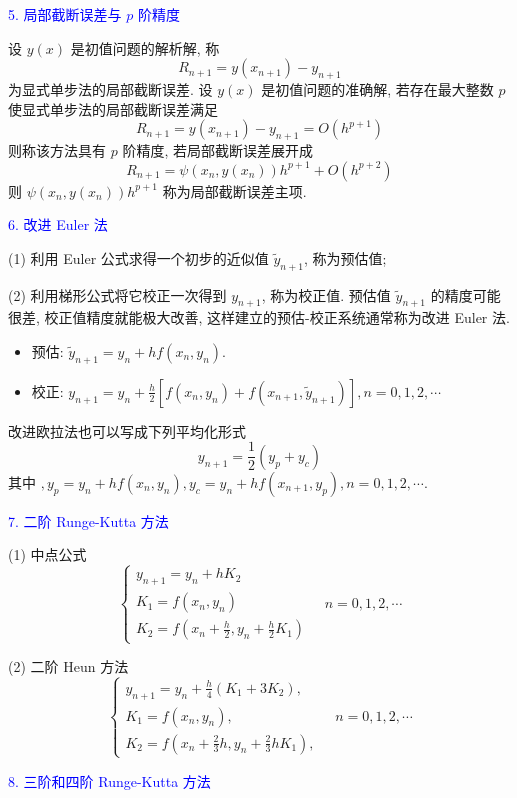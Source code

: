 \textcolor{blue}{5. 局部截断误差与 $ p $ 阶精度}

设 $ y(x) $ 是初值问题的解析解, 称
$$
R_{n+1}=y\left(x_{n+1}\right)-y_{n+1}
$$
为显式单步法的局部截断误差.
设 $ y(x) $ 是初值问题的准确解, 若存在最大整数 $ p $ 使显式单步法的局部截断误差满足
$$
R_{n+1}=y\left(x_{n+1}\right)-y_{n+1}=O\left(h^{p+1}\right)
$$
则称该方法具有 $ p $ 阶精度, 若局部截断误差展开成
$$
R_{n+1}=\psi\left(x_{n}, y\left(x_{n}\right)\right) h^{p+1}+O\left(h^{p+2}\right)
$$
则 $ \psi\left(x_{n}, y\left(x_{n}\right)\right) h^{p+1} $ 称为局部截断误差主项.

\textcolor{blue}{6. 改进 Euler 法}

(1) 利用 Euler 公式求得一个初步的近似值 $ \widetilde{y}_{n+1} $, 称为预估值;

(2) 利用梯形公式将它校正一次得到 $ y_{n+1} $, 称为校正值.
预估值 $ \widetilde{y}_{n+1} $ 的精度可能很差, 校正值精度就能极大改善, 这样建立的预估-校正系统通常称为改进 Euler 法.
\begin{itemize}
    \item 预估: $ \widetilde{y}_{n+1}=y_{n}+h f\left(x_{n}, y_{n}\right) $.
    \item 校正: $ y_{n+1}=y_{n}+\frac{h}{2}\left[f\left(x_{n}, y_{n}\right)+f\left(x_{n+1}, \widetilde{y}_{n+1}\right)\right], n=0,1,2, \cdots $
\end{itemize}
改进欧拉法也可以写成下列平均化形式
$$
y_{n+1}=\frac{1}{2}\left(y_{p}+y_{c}\right)
$$
其中 $ , y_{p}=y_{n}+h f\left(x_{n}, y_{n}\right), y_{c}=y_{n}+h f\left(x_{n+1}, y_{p}\right), n=0,1,2, \cdots $.

\textcolor{blue}{7. 二阶 Runge-Kutta 方法}

(1) 中点公式
$$
\left\{\begin{array}{l}
y_{n+1}=y_{n}+h K_{2} \\
K_{1}=f\left(x_{n}, y_{n}\right) \\
K_{2}=f\left(x_{n}+\frac{h}{2}, y_{n}+\frac{h}{2} K_{1}\right)
\end{array} \quad n=0,1,2, \cdots\right.
$$

(2) 二阶 Heun 方法
$$\left\{\begin{array}{l} y_{n + 1} = y_{n} + \frac{h}{4}\left( K_{1} + 3K_{2} \right), \\ K_{1} = f\left( x_{n},y_{n} \right), \\ K_{2} = f\left( x_{n} + \frac{2}{3}h,y_{n} + \frac{2}{3}hK_{1} \right), \end{array}\quad n = 0,1,2,{\cdots} \right.$$

\textcolor{blue}{8. 三阶和四阶 Runge-Kutta 方法}

